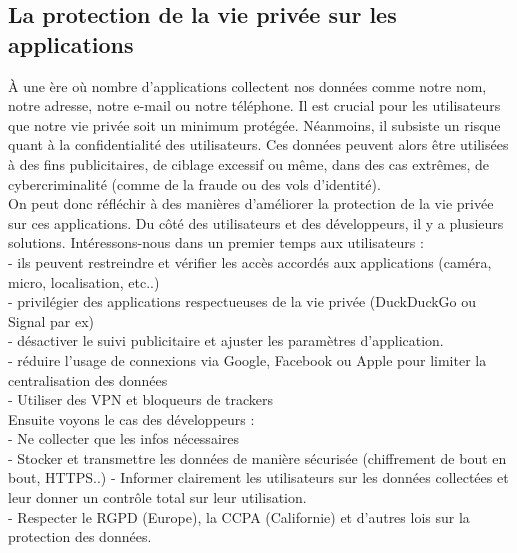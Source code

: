 \documentclass{article}
\begin{document}
\subsection{La protection de la vie privée sur les applications}
À une ère où nombre d'applications collectent nos données  comme notre nom, notre adresse, notre e-mail ou notre téléphone. Il est crucial pour les utilisateurs que notre vie privée soit un minimum protégée. Néanmoins, il subsiste un risque quant à la confidentialité des utilisateurs. Ces données peuvent alors être utilisées à des fins publicitaires, de ciblage excessif ou même, dans des cas extrêmes, de cybercriminalité (comme de la fraude ou des vols d'identité).\\
On peut donc réfléchir à des manières d'améliorer la protection de la vie privée sur ces applications. Du côté des utilisateurs et des développeurs, il y a plusieurs solutions. Intéressons-nous dans un premier temps aux utilisateurs :\\
- ils peuvent restreindre et vérifier les accès accordés aux applications (caméra, micro, localisation, etc..)\\
- privilégier des applications respectueuses de la vie privée (DuckDuckGo ou Signal par ex)\\
- désactiver le suivi publicitaire et ajuster les paramètres d'application.\\
- réduire l'usage de connexions via Google, Facebook ou Apple pour limiter la centralisation des données \\
- Utiliser des VPN et bloqueurs de trackers\\
Ensuite voyons le cas des développeurs : \\
- Ne collecter que les infos nécessaires \\
- Stocker et transmettre les données de manière sécurisée (chiffrement de bout en bout, HTTPS..)
- Informer clairement les utilisateurs sur les données collectées et leur donner un contrôle total sur leur utilisation. \\
- Respecter le RGPD (Europe), la CCPA (Californie) et d’autres lois sur la protection des données. \\
\end{document}
